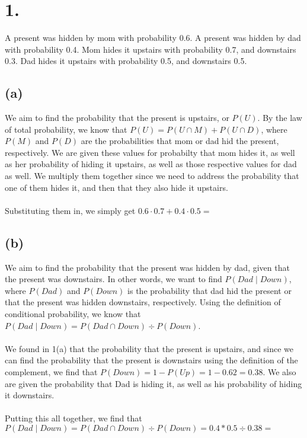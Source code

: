 \documentclass{article}
\begin{document}
\thispagestyle{firstpageheader}

\section*{1.}
{\Large 
A present was hidden by mom with probability 0.6.
A present was hidden by dad with probability 0.4.
Mom hides it upstairs with probability 0.7, and downstairs 0.3.
Dad hides it upstairs with probability 0.5, and downstairs 0.5.

\subsection*{(a)}
We aim to find the probability that the present is upstairs, or $P(U)$. By the law of total probability, we know that $P(U)= P(U \cap M) + P(U \cap D)$, where $P(M)$ and $P(D)$ are the probabilities that mom or dad hid the present, respectively. We are given these values for probabilty that mom hides it, as well as her probability of hiding it upstairs, as well as those respective values for dad as well. We multiply them together since we need to address the probability that one of them hides it, and then that they also hide it upstairs. \\ \\
Substituting them in, we simply get $0.6 \cdot 0.7 + 0.4 \cdot 0.5 =$ 

\subsection*{(b)}
We aim to find the probability that the present was hidden by dad, given that the present was downstairs. In other words, we want to find $P(Dad \mid Down)$, where $P(Dad)$ and $P(Down)$ is the probability that dad hid the present or that the present was hidden downstairs, respectively. Using the definition of conditional probability, we know that $P(Dad \mid Down) = P(Dad \cap Down) \div P(Down)$.  \\ \\
We found in 1(a) that the probability that the present is upstairs, and since we can find the probability that the present is downstairs using the definition of the complement, we find that $P(Down) = 1 - P(Up) = 1 - 0.62 = 0.38$. We also are given the probability that Dad is hiding it, as well as his probability of hiding it downstairs. \\ \\ 
Putting this all together, we find that $P(Dad \mid Down) = P(Dad \cap Down) \div P(Down) = 0.4 * 0.5 \div 0.38 = $ 
}
\end{document}
